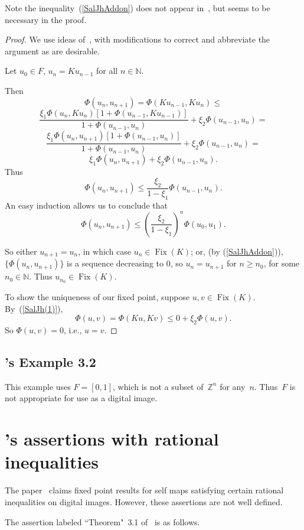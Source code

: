 \documentclass{article}
\numberwithin{thm}{section}
\DeclareMathOperator{\Fix}{Fix}
\def\Z{{\mathbb Z}}
\def\N{{\mathbb N}}
\begin{document}
Note the inequality~(\ref{SalJhAddon})
does not appear in~\cite{SalJh}, but
seems to be necessary in the proof.

\begin{proof}
    We use ideas of~\cite{SalJh}, with modifications
    to correct and
    abbreviate the argument
    as are desirable.

    Let $u_0 \in F$,
    $u_n = Ku_{n-1}$
    for all $n \in \N$.
        
    Then
    \[ \Phi(u_n,u_{n+1}) =
    \Phi(Ku_{n-1},Ku_n) \le \]
    \[ \frac{\xi_1 \Phi(u_n,Ku_n) [1+\Phi(u_{n-1},Ku_{n-1})]}{1+\Phi(u_{n-1},u_n)} +
    \xi_2 \Phi(u_{n-1},u_n) =
    \]
    \[ \frac{\xi_1 \Phi(u_n,u_{n+1})[1+\Phi(u_{n-1},u_n)]}{1+\Phi(u_{n-1},u_n)}+
    \xi_2 \Phi(u_{n-1},u_n) =
    \]
    \[ \xi_1 \Phi(u_n,u_{n+1}) +
    \xi_2 \Phi(u_{n-1},u_n).
    \]
    Thus
    \[ \Phi(u_n,u_{n+1}) \le \frac{\xi_2}{1-\xi_1} \Phi(u_{n-1},u_n).
    \]
An easy induction allows us to conclude that
 \[ \Phi(u_n,u_{n+1}) \le \left (\frac{\xi_2}{1-\xi_1}
 \right ) ^n \Phi(u_0,u_1).
    \]

So either $u_{n+1}=u_n$, in which case
$u_n \in \Fix(K)$; or, (by (\ref{SalJhAddon})), $\{\Phi(u_n,u_{n+1})\}$ is a sequence decreasing to 0,
so $u_n=u_{n+1}$ for $n \ge n_0$, for some
$n_0 \in \N$. Thus $u_{n_0} \in \Fix(K)$.

To show the uniqueness
of our fixed point,
suppose $u,v \in \Fix(K)$. By~(\ref{SalJh(1)}),
\[ \Phi(u,v) = \Phi(Ku,Kv) \le 
0 + \xi_2 \Phi(u,v).
\]
So $\Phi(u,v)=0$, i.e.,
$u=v$.
\end{proof}

\subsection{\cite{SalJh}'s Example 3.2}
    This example uses
    $F=[0,1]$, which is
    not a subset of~$\Z^n$ for any~$n$. Thus~$F$
    is not appropriate
    for use as a digital image.

\section{\cite{Shukla}'s assertions with rational inequalities}
The paper~\cite{Shukla}
claims fixed point 
results for self maps
satisfying certain
rational inequalities
on digital images.
However, these assertions are not well
defined.

The assertion labeled
``Theorem"~3.1 of~\cite{Shukla} is as
follows.
\end{document}

